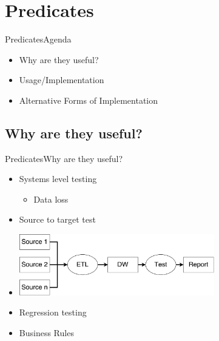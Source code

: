
\section{Predicates}
\begin{frame}{Predicates}{Agenda}
  \begin{itemize}
    \item<1-> Why are they useful?
    \item<1-> Usage/Implementation 
    \item<1-> Alternative Forms of Implementation
  \end{itemize}
\end{frame}

\subsection{Why are they useful?}
\begin{frame}{Predicates}{Why are they useful?}
	\begin{itemize}
		\item<1-> Systems level testing
			\begin{itemize}
				\item Data loss
			\end{itemize}
		\item<2-> Source to target test
		\item<2-> \includegraphics[width=8.5cm]{figures/scenario.pdf}
		\item<3-> Regression testing
		\item<3-> Business Rules
	\end{itemize}
\end{frame}

